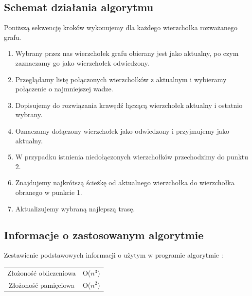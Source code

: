 \documentclass[10pt,oneside]{article}
\begin{document}
\subsection{Schemat działania algorytmu}
 Poniższą sekwencję kroków wykonujemy dla każdego wierzchołka rozważanego grafu.
\newline
\begin{enumerate}
	\item Wybrany przez nas wierzchołek grafu obierany jest jako aktualny, po czym zaznaczamy go jako wierzchołek odwiedzony.
	\item Przeglądamy listę połączonych wierzchołków z aktualnym i wybieramy połączenie o najmniejszej wadze.
	\item Dopisujemy do rozwiązania krawędź łączącą wierzchołek aktualny i ostatnio wybrany.
	\item Oznaczamy dołączony wierzchołek jako odwiedzony i przyjmujemy jako aktualny.
	\item W przypadku istnienia niedołączonych wierzchołków przechodzimy do punktu 2.
	\item Znajdujemy najkrótszą ścieżkę od aktualnego wierzchołka do wierzchołka obranego w punkcie 1.
	\item Aktualizujemy wybraną najlepszą trasę.
\end{enumerate}

\subsection{Informacje o zastosowanym algorytmie}
\begin{center}
	Zestawienie podstawowych informacji o użytym w programie algorytmie :
	\newline \newline
	\begin{tabular}{|c|c|} \hline
		Złożoność obliczeniowa & O($n^{3}$)
		\\[10pt] Złożoność pamięciowa & O($n^{2}$) \\ \hline
	\end{tabular}
\end{center}
\end{document}
